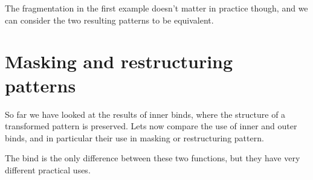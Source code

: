 The fragmentation in the first example doesn't matter in practice
though, and we can consider the two resulting patterns to be equivalent.

\section{Masking and restructuring
patterns}\label{masking-and-restructuring-patterns}

So far we have looked at the results of inner binds, where the structure
of a transformed pattern is preserved. Lets now compare the use of inner
and outer binds, and in particular their use in masking or restructuring
pattern.

\begin{Shaded}
\begin{Highlighting}[]
 
\OtherTok{=}  \OperatorTok{$} \NormalTok{ []}

  \OtherTok{{-}\textgreater{}} \OtherTok{{-}\textgreater{}} 
\OtherTok{=}
\NormalTok{ \_ }\OtherTok{=}

   \OtherTok{{-}\textgreater{}} \OtherTok{{-}\textgreater{}} 
\OtherTok{=}\OtherTok{{-}\textgreater{}}

   \OtherTok{{-}\textgreater{}} \OtherTok{{-}\textgreater{}} 
\OtherTok{=}\OtherTok{{-}\textgreater{}}
\end{Highlighting}
\end{Shaded}

The bind is the only difference between these two functions, but they
have very different practical uses.

